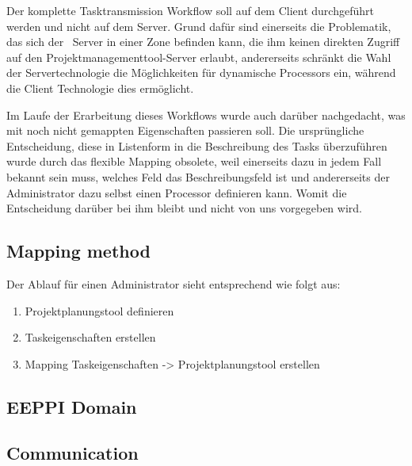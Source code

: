 			Der komplette Tasktransmission Workflow soll auf dem Client durchgeführt werden und nicht auf dem Server. Grund dafür sind einerseits die Problematik, 
			das sich der \eeppi\ Server in einer Zone befinden kann, 
			die ihm keinen direkten Zugriff auf den Projektmanagementtool-Server erlaubt,
			andererseits schränkt die Wahl der Servertechnologie die Möglichkeiten für dynamische Processors ein, während die Client Technologie dies ermöglicht.
			
			Im Laufe der Erarbeitung dieses Workflows wurde auch darüber nachgedacht, 
			was mit noch nicht gemappten Eigenschaften passieren soll. 
			Die ursprüngliche Entscheidung, diese in Listenform in die Beschreibung des Tasks
			überzuführen wurde durch das flexible Mapping obsolete, 
			weil einerseits dazu in jedem Fall bekannt sein muss, welches Feld das Beschreibungsfeld ist 
			und andererseits der Administrator dazu selbst einen Processor definieren kann.
			Womit die Entscheidung darüber bei ihm bleibt und nicht von uns vorgegeben wird.
		
		
		\subsection{Mapping method}
		
		Der Ablauf für einen Administrator sieht entsprechend wie folgt aus:
		\begin{enumerate}
			\item Projektplanungstool definieren
			\item Taskeigenschaften erstellen
			\item Mapping Taskeigenschaften -> Projektplanungstool erstellen
		\end{enumerate}
		
		
		\subsection{EEPPI Domain}
			
				
		
		\subsection{Communication}